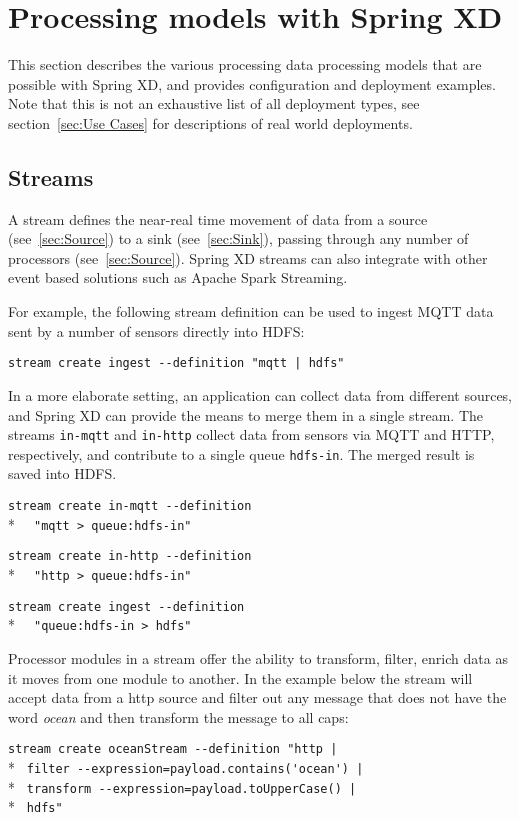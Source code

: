 \section{Processing models with Spring XD}
This section describes the various processing data processing models that are possible with
Spring XD, and provides configuration and deployment examples.
Note that this is not an exhaustive list of all
deployment types, see section~\ref{sec:Use Cases} for descriptions of real
world deployments.

\subsection {Streams}

A stream defines the near-real time movement of data from a source (see~\ref{sec:Source}) to a
sink (see~\ref{sec:Sink}), passing through any number of processors (see~\ref{sec:Source}).  Spring XD streams can
also integrate with other event based solutions such as Apache Spark Streaming.

For example, the following stream definition can be used to ingest
MQTT\cite{mqtt} data sent by a number of sensors directly into HDFS:

\verb;stream create ingest --definition "mqtt | hdfs";

In a more elaborate setting, an application can collect data from
different sources, and Spring XD can provide the means to merge them
in a single stream. The streams \texttt{in-mqtt} and \texttt{in-http}
collect data from sensors via MQTT and HTTP, respectively, and
contribute to a single queue \texttt{hdfs-in}. The merged result
is saved into HDFS.

\verb;stream create in-mqtt --definition ;\\*
\verb;  "mqtt > queue:hdfs-in";

\verb;stream create in-http --definition  ;\\*
\verb;  "http > queue:hdfs-in";

\verb;stream create ingest --definition  ;\\*
\verb;  "queue:hdfs-in > hdfs";

Processor modules in a stream offer the ability to transform, filter,
enrich data as it moves from one module to another.  In the example below
the stream will accept data from a http source and filter out any message
that does not have the word \emph{ocean} and then transform the message
to all caps:

\verb;stream create oceanStream --definition "http |;\\*
\verb; filter --expression=payload.contains('ocean') |;\\*
\verb; transform --expression=payload.toUpperCase() |;\\*
\verb; hdfs";

